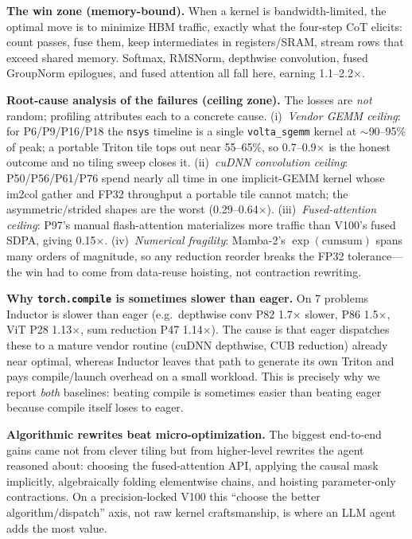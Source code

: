 \documentclass[conference]{IEEEtran}
\begin{document}
\textbf{The win zone (memory-bound).} When a kernel is bandwidth-limited, the
optimal move is to minimize HBM traffic, exactly what the four-step CoT elicits:
count passes, fuse them, keep intermediates in registers/SRAM, stream rows that
exceed shared memory. Softmax, RMSNorm, depthwise convolution, fused GroupNorm
epilogues, and fused attention all fall here, earning 1.1--2.2$\times$.

\textbf{Root-cause analysis of the failures (ceiling zone).} The losses are
\emph{not} random; profiling attributes each to a concrete cause.
(i)~\emph{Vendor GEMM ceiling}: for P6/P9/P16/P18 the \texttt{nsys} timeline is a
single \texttt{volta\_sgemm} kernel at $\sim$90--95\% of peak; a portable Triton
tile tops out near 55--65\%, so 0.7--0.9$\times$ is the honest outcome and no
tiling sweep closes it. (ii)~\emph{cuDNN convolution ceiling}: P50/P56/P61/P76
spend nearly all time in one implicit-GEMM kernel whose im2col gather and FP32
throughput a portable tile cannot match; the asymmetric/strided shapes are the
worst (0.29--0.64$\times$). (iii)~\emph{Fused-attention ceiling}: P97's manual
flash-attention materializes more traffic than V100's fused SDPA, giving
0.15$\times$. (iv)~\emph{Numerical fragility}: Mamba-2's
$\exp(\mathrm{cumsum})$ spans many orders of magnitude, so any reduction
reorder breaks the FP32 tolerance---the win had to come from data-reuse
hoisting, not contraction rewriting.

\textbf{Why \texttt{torch.compile} is sometimes slower than eager.} On 7
problems Inductor is slower than eager (e.g.\ depthwise conv P82 1.7$\times$
slower, P86 1.5$\times$, ViT P28 1.13$\times$, sum reduction P47 1.14$\times$).
The cause is that eager dispatches these to a mature vendor routine
(cuDNN depthwise, CUB reduction) already near optimal, whereas Inductor leaves
that path to generate its own Triton and pays compile/launch overhead on a small
workload. This is precisely why we report \emph{both} baselines: beating compile
is sometimes easier than beating eager because compile itself loses to eager.

\textbf{Algorithmic rewrites beat micro-optimization.} The biggest end-to-end
gains came not from clever tiling but from higher-level rewrites the agent
reasoned about: choosing the fused-attention API, applying the causal mask
implicitly, algebraically folding elementwise chains, and hoisting
parameter-only contractions. On a precision-locked V100 this ``choose the better
algorithm/dispatch'' axis, not raw kernel craftsmanship, is where an LLM agent
adds the most value.
\end{document}
